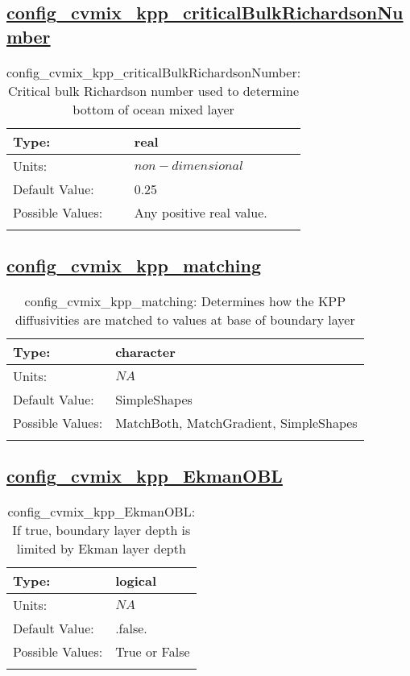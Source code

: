 \subsection[config\_cvmix\_kpp\_criticalBulkRichardsonNumber]{\hyperref[sec:nm_tab_cvmix]{config\_cvmix\_kpp\_criticalBulkRichardsonNumber}}
\label{subsec:nm_sec_config_cvmix_kpp_criticalBulkRichardsonNumber}
\begin{center}
\begin{longtable}{| p{2.0in} || p{4.0in} |}
    \hline
    Type: & real \\
    \hline
    Units: & $non-dimensional$ \\
    \hline
    Default Value: & 0.25 \\
    \hline
    Possible Values: & Any positive real value. \\
    \hline
    \caption{config\_cvmix\_kpp\_criticalBulkRichardsonNumber: Critical bulk Richardson number used to determine bottom of ocean mixed layer}
\end{longtable}
\end{center}
\subsection[config\_cvmix\_kpp\_matching]{\hyperref[sec:nm_tab_cvmix]{config\_cvmix\_kpp\_matching}}
\label{subsec:nm_sec_config_cvmix_kpp_matching}
\begin{center}
\begin{longtable}{| p{2.0in} || p{4.0in} |}
    \hline
    Type: & character \\
    \hline
    Units: & $NA$ \\
    \hline
    Default Value: & SimpleShapes \\
    \hline
    Possible Values: & MatchBoth, MatchGradient, SimpleShapes \\
    \hline
    \caption{config\_cvmix\_kpp\_matching: Determines how the KPP diffusivities are matched to values at base of boundary layer}
\end{longtable}
\end{center}
\subsection[config\_cvmix\_kpp\_EkmanOBL]{\hyperref[sec:nm_tab_cvmix]{config\_cvmix\_kpp\_EkmanOBL}}
\label{subsec:nm_sec_config_cvmix_kpp_EkmanOBL}
\begin{center}
\begin{longtable}{| p{2.0in} || p{4.0in} |}
    \hline
    Type: & logical \\
    \hline
    Units: & $NA$ \\
    \hline
    Default Value: & .false. \\
    \hline
    Possible Values: & True or False \\
    \hline
    \caption{config\_cvmix\_kpp\_EkmanOBL: If true, boundary layer depth is limited by Ekman layer depth}
\end{longtable}
\end{center}
